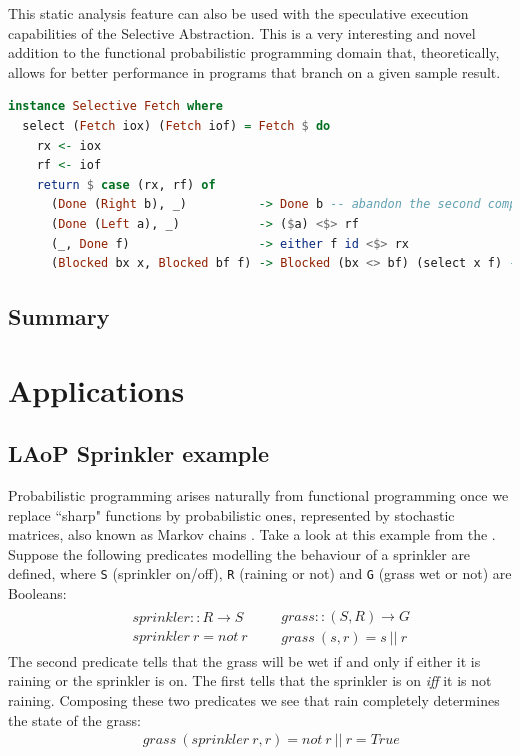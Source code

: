 \documentclass[
  oneside,
  11pt, a4paper,
  footinclude=true,
  headinclude=true,
  cleardoublepage=empty
]{scrbook}
\theoremstyle{definition}
\theoremstyle{definition}
\def\start{&&}
\def\more{\\&&}
\begin{document}
This static analysis feature can also be used with the speculative execution capabilities of the Selective Abstraction. This is a very interesting and novel addition to the functional probabilistic programming domain that, theoretically, allows for better performance in programs that branch on a given sample result.

    \begin{lstlisting}[language=Haskell, caption={Fetch Selective instance},captionpos=b]
instance Selective Fetch where
  select (Fetch iox) (Fetch iof) = Fetch $ do
    rx <- iox
    rf <- iof
    return $ case (rx, rf) of
      (Done (Right b), _)          -> Done b -- abandon the second computation
      (Done (Left a), _)           -> ($a) <$> rf
      (_, Done f)                  -> either f id <$> rx
      (Blocked bx x, Blocked bf f) -> Blocked (bx <> bf) (select x f) -- speculative execution
    \end{lstlisting}
    
    \section{Summary}
    
    \chapter{Applications}\label{ch-applications}
    
        \section{LAoP Sprinkler example}
        
        Probabilistic programming arises naturally from functional programming once we replace ``sharp" functions by probabilistic ones, represented by stochastic matrices, also known as Markov chains \cite{oliveira2012towards}. Take a look at this example from the \citet{wiki:BayesianNetwork}. Suppose the following predicates modelling the behaviour of a sprinkler are defined, where \texttt{S} (sprinkler on/off), \texttt{R} (raining or not) and \texttt{G} (grass wet or not) are Booleans:
        \begin{eqnarray*}
        \begin{array}{rcl}
        \start sprinkler :: R \to S
        \more sprinkler\ r = not\ r
        \end{array}
        \begin{array}{rcl}
        \start grass :: (S, R) \to G
        \more grass\ (s,r) = s\ ||\ r
        \end{array}
        \end{eqnarray*}
        The second predicate tells that the grass will be wet if and only if either it is raining or the sprinkler is on. The first tells that the sprinkler is on \emph{iff} it is not raining. Composing these two predicates we see that rain completely determines the state of the grass:
        \begin{eqnarray*}
        \start grass\ (sprinkler\ r,r) = not\ r\ ||\ r = True
        \end{eqnarray*}
        
\end{document}
